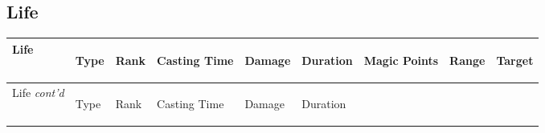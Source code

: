\documentclass[twoside]{book}
\begin{document}
    

\subsection{Life}
    
\begin{longtable}{p{1.25in}lp{2em}p{3em}llp{7em}ll} 
  Life
  &
  \begin{turn}{70}{Type}\end{turn}
          
  &
  \begin{turn}{70}{Rank}\end{turn}
          
  &
  \begin{turn}{70}{Casting Time}\end{turn}
          
  &
  \begin{turn}{70}{Damage}\end{turn}
          
  &
  \begin{turn}{70}{Duration}\end{turn}
          
  &
  \begin{turn}{70}{Magic Points}\end{turn}
          
  &
  \begin{turn}{70}{Range}\end{turn}
          
  &
  \begin{turn}{70}{Target}\end{turn}
          
  \\
  \hline
  \hline
  \endfirsthead
  Life \textit{cont'd}
        
  &
  \begin{turn}{70}{Type}\end{turn}
          
  &
  \begin{turn}{70}{Rank}\end{turn}
          
  &
  \begin{turn}{70}{Casting Time}\end{turn}
          
  &
  \begin{turn}{70}{Damage}\end{turn}
          
  &
  \begin{turn}{70}{Duration}\end{turn}
          

\end{longtable}
\end{document}
